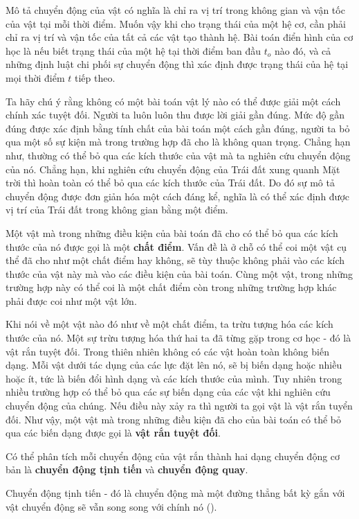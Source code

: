Mô tả chuyển động của vật có nghĩa là chỉ ra vị trí trong không gian và vận tốc của vật tại mỗi thời điểm. Muốn vậy khi cho trạng thái của một hệ cơ, cần phải chỉ ra vị trí và vận tốc của tất cả các vật tạo thành hệ. Bài toán điển hình của cơ học là nếu biết trạng thái của một hệ tại thời điểm ban đầu ${t_o}$ nào đó, và cả những định luật chi phối sự chuyển động thì xác định được trạng thái của hệ tại mọi thời điểm $t$ tiếp theo.

Ta hãy chú ý rằng không có một bài toán vật lý nào có thể được giải một cách chính xác tuyệt đối. Người ta luôn luôn thu được lời giải gần đúng. Mức độ gần đúng được xác định bằng tính chất của bài toán một cách gần đúng, người ta bỏ qua một số sự kiện mà trong trường hợp đã cho là không quan trọng. Chẳng hạn như, thường có thể bỏ qua các kích thước của vật mà ta nghiên cứu chuyển động của nó. Chẳng hạn, khi nghiên cứu chuyển động của Trái đất xung quanh Mặt trời thì hoàn toàn có thể bỏ qua các kích thước của Trái đất. Do đó sự mô tả chuyển động được đơn giản hóa một cách đáng kể, nghĩa là có thể xác định được vị trí của Trái đất trong không gian bằng một điểm.

Một vật mà trong những điều kiện của bài toán đã cho có thể bỏ qua các kích thước của nó được gọi là một \textbf{chất điểm}. Vấn đề là ở chỗ có thể coi một vật cụ thể đã cho như một chất điểm hay không, sẽ tùy thuộc không phải vào các kích thước của vật này mà vào các điều kiện của bài toán. Cùng một vật, trong những trường hợp này có thể coi là một chất điểm còn trong những trường hợp khác phải được coi như một vật lớn.


Khi nói về một vật nào đó như về một chất điểm, ta trừu tượng hóa các kích thước của nó. Một sự trừu tượng hóa thứ hai ta đã từng gặp trong cơ học - đó là vật rắn tuyệt đối. Trong thiên nhiên không có các vật hoàn toàn không biến dạng. Mỗi vật dưới tác dụng của các lực đặt lên nó, sẽ bị biến dạng hoặc nhiều hoặc ít, tức là biến đổi hình dạng và các kích thước của mình. Tuy nhiên trong nhiều trường hợp có thể bỏ qua các sự biến dạng của các vật khi nghiên cứu chuyển động của chúng. Nếu điều này xảy ra thì người ta gọi vật là vật rắn tuyển đối. Như vậy, một vật mà trong những điều kiện đã cho của bài toán có thể bỏ qua các biến dạng được gọi là \textbf{vật rắn tuyệt đối}.

Có thể phân tích mỗi chuyển động của vật rắn thành hai dạng chuyển động cơ bản là \textbf{chuyển động tịnh tiến} và \textbf{chuyển động quay}.

Chuyển động tịnh tiến - đó là chuyển động mà một đường thẳng bất kỳ gắn với vật chuyển động sẽ vẫn song song với chính nó ().

